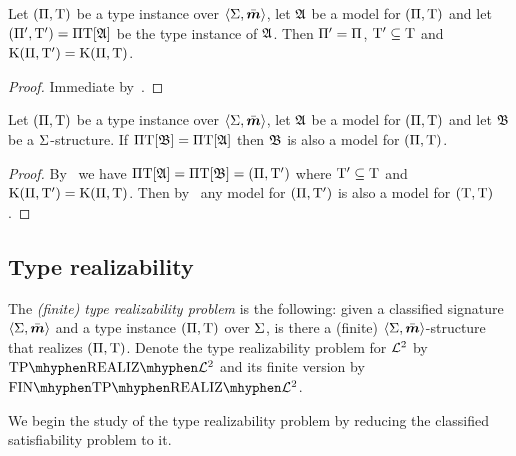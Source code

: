 \begin{remark}\label{rem:tpi-str-ex}
Let $(\Pi,\mathrm{T})$ be a type instance over $\left\langle \mathrm{\Sigma},\bar{\bm{m}} \right\rangle$, 
let $\mathfrak{A}$ be a model for $(\Pi,\mathrm{T})$
and let $({\Pi'},{\mathrm{T}'}) =\Pi\mathrm{T}[\mathfrak{A}]$ be the type instance of $\mathfrak{A}$.
Then ${\Pi'} = \Pi$, ${\mathrm{T}'} \subseteq \mathrm{T}$ and $\mathrm{K}(\Pi,{\mathrm{T}'}) =
\mathrm{K}(\Pi,\mathrm{T})$.
\end{remark}
\begin{proof}
Immediate by~.
\end{proof}
\begin{remark}\label{rem:tpi-str-inv}
Let $(\Pi,\mathrm{T})$ be a type instance over $\left\langle \mathrm{\Sigma},\bar{\bm{m}} \right\rangle$,
let $\mathfrak{A}$ be a model for $(\Pi,\mathrm{T})$
and let $\mathfrak{B}$ be a $\mathrm{\Sigma}$-structure.
If $\Pi\mathrm{T}[\mathfrak{B}] = \Pi\mathrm{T}[\mathfrak{A}]$ then $\mathfrak{B}$ is also a model for
$(\Pi,\mathrm{T})$.
\end{remark}
\begin{proof}
By~ we have $\Pi\mathrm{T}[\mathfrak{A}] = \Pi\mathrm{T}[\mathfrak{B}] =
(\Pi,{\mathrm{T}'})$ where ${\mathrm{T}'} \subseteq \mathrm{T}$ and $\mathrm{K}(\Pi,{\mathrm{T}'}) =
\mathrm{K}(\Pi,\mathrm{T})$. Then by~ any model for $(\Pi,{\mathrm{T}'})$
is also a model for $(\mathrm{T},\mathrm{T})$.
\end{proof}
\subsection{Type realizability}
\begin{definition}
The \emph{(finite) type realizability problem} is the following:
given a classified signature $\left\langle \mathrm{\Sigma},\bar{\bm{m}} \right\rangle$ and a type instance
$(\Pi,\mathrm{T})$ over $\mathrm{\Sigma}$, is there a (finite)
$\left\langle \mathrm{\Sigma},\bar{\bm{m}} \right\rangle$-structure that realizes $(\Pi,\mathrm{T})$.
Denote the type realizability problem for $\mathcal{L}^{2}$ by
$\Real{\vFo2}$ and its finite version by $\FinReal{\vFo2}$.
\end{definition}

We begin the study of the type realizability problem by reducing the
classified satisfiability problem to it.

